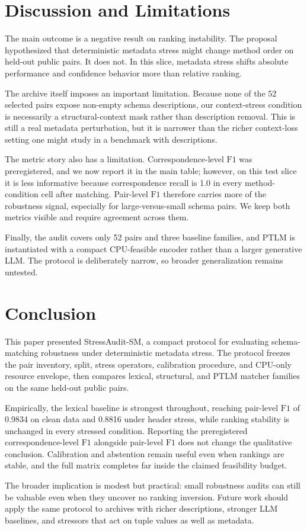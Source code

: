 \documentclass{article}
\newcommand{\stressaudit}{StressAudit-SM}
\newcommand{\fone}{\mbox{$\mathrm{F1}$}}
\begin{document}
\section{Discussion and Limitations}
\label{sec:discussion}

The main outcome is a negative result on ranking instability. The proposal hypothesized that deterministic metadata stress might change method order on held-out public pairs. It does not. In this slice, metadata stress shifts absolute performance and confidence behavior more than relative ranking.

The archive itself imposes an important limitation. Because none of the 52 selected pairs expose non-empty schema descriptions, our context-stress condition is necessarily a structural-context mask rather than description removal. This is still a real metadata perturbation, but it is narrower than the richer context-loss setting one might study in a benchmark with descriptions.

The metric story also has a limitation. Correspondence-level \fone{} was preregistered, and we now report it in the main table; however, on this test slice it is less informative because correspondence recall is 1.0 in every method-condition cell after matching. Pair-level \fone{} therefore carries more of the robustness signal, especially for large-versus-small schema pairs. We keep both metrics visible and require agreement across them.

Finally, the audit covers only 52 pairs and three baseline families, and PTLM is instantiated with a compact CPU-feasible encoder rather than a larger generative LLM. The protocol is deliberately narrow, so broader generalization remains untested.

\section{Conclusion}
\label{sec:conclusion}

This paper presented \stressaudit, a compact protocol for evaluating schema-matching robustness under deterministic metadata stress. The protocol freezes the pair inventory, split, stress operators, calibration procedure, and CPU-only resource envelope, then compares lexical, structural, and PTLM matcher families on the same held-out public pairs.

Empirically, the lexical baseline is strongest throughout, reaching pair-level \fone{} of 0.9834 on clean data and 0.8816 under header stress, while ranking stability is unchanged in every stressed condition. Reporting the preregistered correspondence-level \fone{} alongside pair-level \fone{} does not change the qualitative conclusion. Calibration and abstention remain useful even when rankings are stable, and the full matrix completes far inside the claimed feasibility budget.

The broader implication is modest but practical: small robustness audits can still be valuable even when they uncover no ranking inversion. Future work should apply the same protocol to archives with richer descriptions, stronger LLM baselines, and stressors that act on tuple values as well as metadata.



\end{document}
